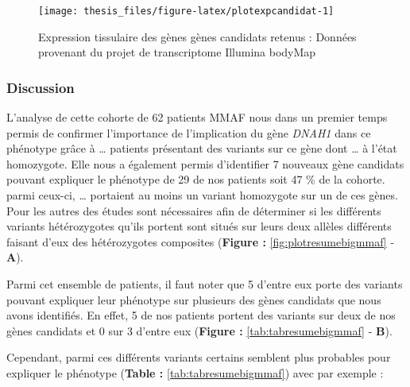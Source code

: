 \documentclass[12pt,twoside]{reedthesis}
\theoremstyle{definition}
\theoremstyle{definition}
\theoremstyle{remark}
\begin{document}
  \newpage
  
  \begin{figure}
  
  {\centering \texttt{[image: thesis\_files/figure-latex/plotexpcandidat-1]} 
  
  }
  
  \caption[Expression tissulaire des gènes gènes candidats retenus]{Expression tissulaire des gènes gènes candidats retenus : Données provenant du projet de transcriptome Illumina bodyMap}\label{fig:plotexpcandidat}
  \end{figure}
  
  \newpage
  
  \subsubsection{Discussion}\label{discussion-1}
  
  L'analyse de cette cohorte de 62 patients MMAF nous dans un premier
  temps permis de confirmer l'importance de l'implication du gène
  \emph{DNAH1} dans ce phénotype grâce à \ldots{} patients présentant des
  variants sur ce gène dont \ldots{} à l'état homozygote. Elle nous a
  également permis d'identifier 7 nouveaux gène candidats pouvant
  expliquer le phénotype de 29 de nos patients soit 47 \% de la cohorte.
  parmi ceux-ci, \ldots{} portaient au moins un variant homozygote sur un
  de ces gènes. Pour les autres des études sont nécessaires afin de
  déterminer si les différents variants hétérozygotes qu'ils portent sont
  situés sur leurs deux allèles différents faisant d'eux des hétérozygotes
  composites (\textbf{Figure : }\ref{fig:plotresumebigmmaf} - \textbf{A}).
  
  Parmi cet ensemble de patients, il faut noter que 5 d'entre eux porte
  des variants pouvant expliquer leur phénotype sur plusieurs des gènes
  candidats que nous avons identifiés. En effet, 5 de nos patients portent
  des variants sur deux de nos gènes candidats et 0 sur 3 d'entre eux
  (\textbf{Figure : }\ref{tab:tabresumebigmmaf} - \textbf{B}).
  
  Cependant, parmi ces différents variants certains semblent plus
  probables pour expliquer le phénotype (\textbf{Table :
  }\ref{tab:tabresumebigmmaf}) avec par exemple :
  
\end{document}
